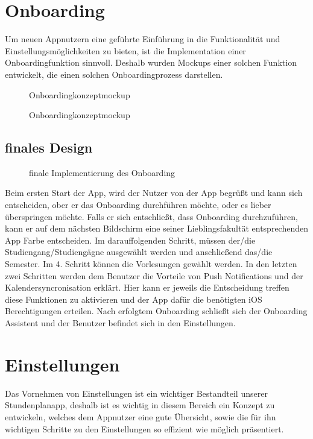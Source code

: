 \section{Onboarding}

Um neuen Appnutzern eine geführte Einführung in die Funktionalität und Einstellungsmöglichkeiten zu bieten, ist die Implementation einer Onboardingfunktion sinnvoll. Deshalb wurden Mockups einer solchen Funktion entwickelt, die einen solchen Onboardingprozess darstellen.

\begin{figure}[H]
	\centering
	\caption{Onboardingkonzeptmockup}
	\label{fig1}
\end{figure}

\begin{figure}[H]
	\centering
	\caption{Onboardingkonzeptmockup}
	\label{fig1}
\end{figure}

\subsection{finales Design}
\begin{figure}[H]
	\centering
	\caption{finale Implementierung des Onboarding}
	\label{fig1}
\end{figure}

Beim ersten Start der App, wird der Nutzer von der App begrüßt und kann sich entscheiden, ober er das Onboarding durchführen möchte, oder es lieber überspringen möchte. Falls er sich entschließt, dass Onboarding durchzuführen, kann er auf dem nächsten Bildschirm eine seiner Lieblingsfakultät entsprechenden App Farbe entscheiden. Im darauffolgenden Schritt, müssen der/die Studiengang/Studiengägne ausgewählt werden und anschließend das/die Semester.  Im 4. Schritt können die Vorlesungen gewählt werden. In den letzten zwei Schritten werden dem Benutzer die Vorteile von Push Notifications und der Kalendersyncronisation erklärt. Hier kann er jeweils die Entscheidung treffen diese Funktionen zu aktivieren und der App dafür die benötigten iOS Berechtigungen erteilen. Nach erfolgtem Onboarding schließt sich der Onboarding Assistent und der Benutzer befindet sich in den Einstellungen.



\section{Einstellungen}
Das Vornehmen von Einstellungen ist ein wichtiger Bestandteil unserer Stundenplanapp, deshalb ist es wichtig in diesem Bereich ein Konzept zu entwickeln, welches dem Appnutzer eine gute Übersicht, sowie die für ihn wichtigen Schritte zu den Einstellungen so effizient wie möglich präsentiert.


